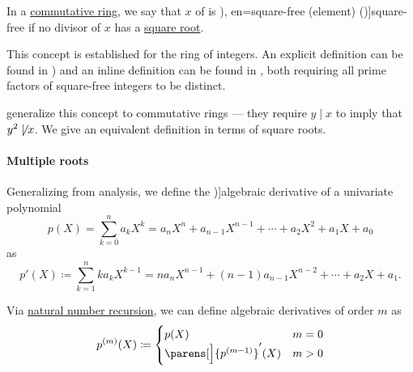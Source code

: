 \begin{definition}\label{def:square_free_element}\mimprovised
   In a \hyperref[def:ring/commutative]{commutative ring}, we say that \( x \) of is \term[ru=свободное от квадратов (число) (\cite[def. 93]{Бухштаб1966ТеорияЧисел}), en=square-free (element) (\cite[79]{JędrzejewiczEtAl2017SquareFree})]{square-free} if no  divisor of \( x \) has a \hyperref[def:nth_root]{square root}.
\end{definition}
\begin{comments}
  \item This concept is established for the ring of integers. An explicit definition can be found in \cite[def. 93]{Бухштаб1966ТеорияЧисел}) and an inline definition can be found in \cite[176]{Birkhoff1967Lattices}, both requiring all prime factors of square-free integers to be distinct.

   generalize this concept to commutative rings --- they require \( y \mid x \) to imply that \( y^2 \not\mid x \). We give an equivalent definition in terms of square roots.
\end{comments}

\paragraph{Multiple roots}

\begin{definition}\label{def:algebraic_derivative}
  Generalizing  from analysis, we define the \term[ru=производная (\cite[163]{Тыртышников2017Алгебра})]{algebraic derivative} of a univariate polynomial
  \begin{equation*}
    p(X) = \sum_{k=0}^n a_k X^k = a_n X^n + a_{n-1} X^{n-1} + \cdots + a_2 X^2 + a_1 X + a_0
  \end{equation*}
  as
  \begin{equation*}
    p'(X) \coloneqq \sum_{k=1}^n k a_k X^{k-1} = n a_n X^{n-1} + (n-1) a_{n-1} X^{n-2} + \cdots + a_2 X + a_1.
  \end{equation*}

  Via \hyperref[rem:natural_number_recursion]{natural number recursion}, we can define algebraic derivatives of order \( m \) as
  \begin{equation*}
    p^{(m)}(X) \coloneqq \begin{cases}
      p(X)              &m = 0 \\
      \parens[\Big]{ p^{(m - 1)} }'(X) &m > 0
    \end{cases}
  \end{equation*}
\end{definition}

